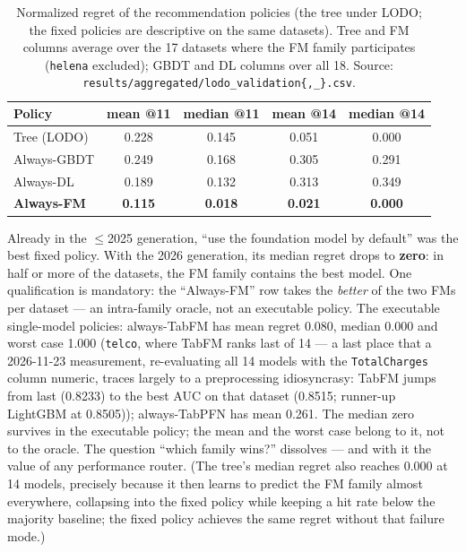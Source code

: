 \documentclass[11pt]{article}
\begin{document}
\begin{table}[h]
\centering
\caption{Normalized regret of the recommendation policies (the tree
under LODO; the fixed policies are descriptive on the same datasets).
Tree and FM columns average over the 17 datasets where the FM family
participates (\texttt{helena} excluded); GBDT and DL columns over all 18.
Source: \texttt{results/\allowbreak aggregated/\allowbreak lodo\_\allowbreak validation\{,\allowbreak \_\}.\allowbreak csv}.}
\label{tab:regret}
\small
\begin{tabular}{lcccc}
\toprule
Policy & mean @11 & median @11 & mean @14 & median @14 \\
\midrule
Tree (LODO)       & 0.228 & 0.145 & 0.051 & 0.000 \\
Always-GBDT       & 0.249 & 0.168 & 0.305 & 0.291 \\
Always-DL         & 0.189 & 0.132 & 0.313 & 0.349 \\
\textbf{Always-FM} & \textbf{0.115} & \textbf{0.018} & \textbf{0.021} &
\textbf{0.000} \\
\bottomrule
\end{tabular}
\end{table}

Already in the $\leq$2025 generation, ``use the foundation model by
default'' was the best fixed policy. With the 2026 generation, its median
regret drops to \textbf{zero}: in half or more of the datasets, the FM
family contains the best model. One qualification is mandatory: the
``Always-FM'' row takes the \emph{better} of the two FMs per dataset
--- an intra-family oracle, not an executable policy. The executable
single-model policies: always-TabFM has mean regret 0.080, median
0.000 and worst case 1.000 (\texttt{telco}, where TabFM ranks last of
14 --- a last place that a 2026-11-23 measurement, re-evaluating all 14
models with the \texttt{TotalCharges} column
numeric, traces largely to a preprocessing idiosyncrasy: TabFM jumps
from last (0.8233) to the best AUC on that dataset (0.8515; runner-up
LightGBM at 0.8505)); always-TabPFN
has mean 0.261. The median zero survives in the executable policy; the
mean and the worst case belong to it, not to the oracle. The question
``which family wins?''
dissolves --- and with it the value of any performance router. (The
tree's median regret also reaches 0.000 at 14 models, precisely because
it then learns to predict the FM family almost everywhere, collapsing
into the fixed policy while keeping a hit rate below the majority
baseline; the fixed policy achieves the same regret without that failure
mode.)
\end{document}
